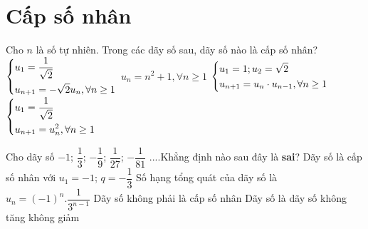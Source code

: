 \section{Cấp số nhân}
\begin{ex}%
Cho $n$ là số tự nhiên. Trong các dãy số sau, dãy số nào là cấp số nhân?
\choice
{\True $\left\{\begin{aligned}&u_1=\dfrac{1}{\sqrt{2}}\\&u_{n+1}=-\sqrt{2}u_n, \forall n\geq 1\end{aligned}\right.$}
{$u_n=n^2+1, \forall n \geq 1$}
{$\left\{\begin{aligned}&u_1=1;u_2=\sqrt{2}\\&u_{n+1}=u_n\cdot u_{n-1}, \forall n \geq 1\end{aligned}\right.$}
{$\left\{\begin{aligned}&u_1=\dfrac{1}{\sqrt{2}}\\&u_{n+1}=u^2_n, \forall n\geq 1\end{aligned}\right.$}
\end{ex}
\begin{ex}%
	Cho dãy số $-1$; $\dfrac{1}{3}$; $-\dfrac{1}{9}$; $\dfrac{1}{27}$; $-\dfrac{1}{81}$ ....Khẳng định nào sau đây là \textbf{sai}?
	\choice
	{Dãy số là cấp số nhân với $u_1=-1$; $q=-\dfrac{1}{3}$}
	{Số hạng tổng quát của dãy số là $u_n=(-1)^n.\dfrac{1}{3^{n-1}}$}
	{\True Dãy số không phải là cấp số nhân}
	{Dãy số là dãy số không tăng không giảm}
	
\end{ex}
